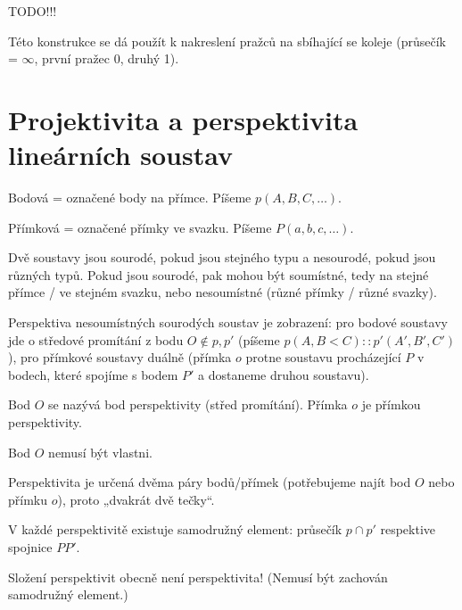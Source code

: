 \documentclass[12pt]{article}					%
\begin{document}
TODO!!!

\begin{poznamka}
	Této konstrukce se dá použít k nakreslení pražců na sbíhající se koleje (průsečík = $∞$, první pražec 0, druhý 1).
\end{poznamka}

\section{Projektivita a perspektivita lineárních soustav}
\begin{definice}[Soustava]
	Bodová = označené body na přímce. Píšeme $p(A, B, C, …)$.

	Přímková = označené přímky ve svazku. Píšeme $P(a, b, c, …)$.

	Dvě soustavy jsou sourodé, pokud jsou stejného typu a nesourodé, pokud jsou různých typů. Pokud jsou sourodé, pak mohou být soumístné, tedy na stejné přímce / ve stejném svazku, nebo nesoumístné (různé přímky / různé svazky).
\end{definice}

\begin{definice}[Perspektiva]
	Perspektiva nesoumístných sourodých soustav je zobrazení: pro bodové soustavy jde o středové promítání z bodu $O \notin p, p'$ (píšeme $p(A, B< C)::p'(A', B', C')$), pro přímkové soustavy duálně (přímka $o$ protne soustavu procházející $P$ v bodech, které spojíme s bodem $P'$ a dostaneme druhou soustavu).

	Bod $O$ se nazývá bod perspektivity (střed promítání). Přímka $o$ je přímkou perspektivity.

	\begin{poznamkain}
		Bod $O$ nemusí být vlastni.
	\end{poznamkain}

	\begin{poznamkain}[Značení $::$]
		Perspektivita je určená dvěma páry bodů/přímek (potřebujeme najít bod $O$ nebo přímku $o$), proto „dvakrát dvě tečky“.
	\end{poznamkain}
\end{definice}

\begin{dusledek}
	V každé perspektivitě existuje samodružný element: průsečík $p \cap p'$ respektive spojnice $P P'$.
\end{dusledek}

\begin{upozorneni}
	Složení perspektivit obecně není perspektivita! (Nemusí být zachován samodružný element.)
\end{upozorneni}
\end{document}
